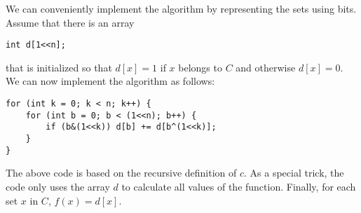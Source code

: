 We can conveniently implement the algorithm by representing
the sets using bits.
Assume that there is an array
\begin{lstlisting}
int d[1<<n];
\end{lstlisting}
that is initialized so that $d[x]=1$ if $x$ belongs to $C$
and otherwise $d[x]=0$.
We can now implement the algorithm as follows:

\begin{lstlisting}
for (int k = 0; k < n; k++) {
    for (int b = 0; b < (1<<n); b++) {
        if (b&(1<<k)) d[b] += d[b^(1<<k)];
    }
}
\end{lstlisting}
The above code is based on the recursive definition
of $c$. As a special trick, the code only uses
the array $d$ to calculate all values of the function.
Finally, for each set $x$ in $C$, $f(x)=d[x]$.

